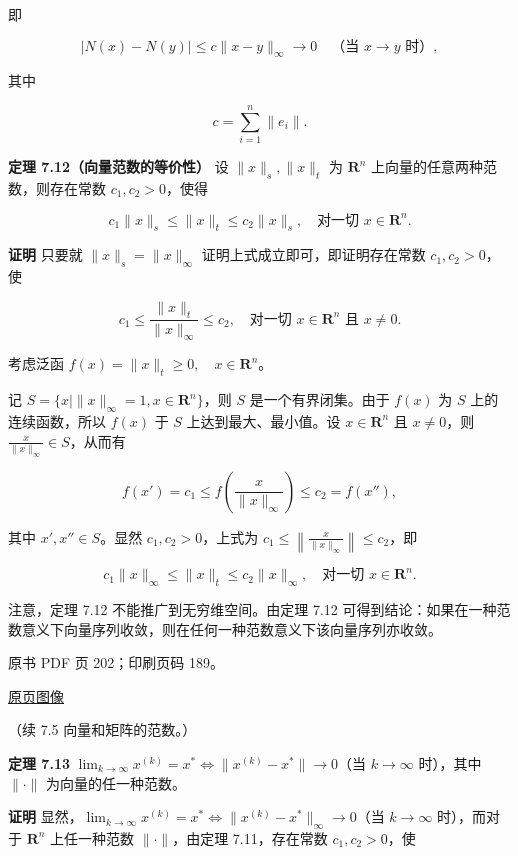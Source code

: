 即

\[
|N(x)-N(y)|\leqslant c\|x-y\|_\infty\to0\quad\text{（当 }x\to y\text{ 时）},
\]

其中

\[
c=\sum_{i=1}^{n}\|e_i\|.
\]

\textbf{定理 7.12（向量范数的等价性）} 设 \(\|x\|_s,\|x\|_t\) 为 \(\mathbf R^n\) 上向量的任意两种范数，则存在常数 \(c_1,c_2>0\)，使得

\[
c_1\|x\|_s\leqslant\|x\|_t\leqslant c_2\|x\|_s,\quad\text{对一切 }x\in\mathbf R^n.
\]

\textbf{证明} 只要就 \(\|x\|_s=\|x\|_\infty\) 证明上式成立即可，即证明存在常数 \(c_1,c_2>0\)，使

\[
c_1\leqslant\frac{\|x\|_t}{\|x\|_\infty}\leqslant c_2,\quad\text{对一切 }x\in\mathbf R^n\text{ 且 }x\neq0.
\]

考虑泛函 \(f(x)=\|x\|_t\geqslant0,\quad x\in\mathbf R^n\)。

记 \(S=\{x\mid\|x\|_\infty=1,x\in\mathbf R^n\}\)，则 \(S\) 是一个有界闭集。由于 \(f(x)\) 为 \(S\) 上的连续函数，所以 \(f(x)\) 于 \(S\) 上达到最大、最小值。设 \(x\in\mathbf R^n\) 且 \(x\neq0\)，则 \(\frac{x}{\|x\|_\infty}\in S\)，从而有

\[
f(x')=c_1\leqslant f\left(\frac{x}{\|x\|_\infty}\right)\leqslant c_2=f(x''),
\tag{7.5.3}
\]

其中 \(x',x''\in S\)。显然 \(c_1,c_2>0\)，上式为 \(c_1\leqslant\left\|\frac{x}{\|x\|_\infty}\right\|\leqslant c_2\)，即

\[
c_1\|x\|_\infty\leqslant\|x\|_t\leqslant c_2\|x\|_\infty,\quad\text{对一切 }x\in\mathbf R^n.
\]

注意，定理 7.12 不能推广到无穷维空间。由定理 7.12 可得到结论：如果在一种范数意义下向量序列收敛，则在任何一种范数意义下该向量序列亦收敛。

\clearpage

原书 PDF 页 202；印刷页码 189。

\href{source-images/pdf-202.jpeg}{原页图像}

（续 7.5 向量和矩阵的范数。）

\textbf{定理 7.13} \(\lim_{k\to\infty}x^{(k)}=x^*\Longleftrightarrow\|x^{(k)}-x^*\|\to0\)（当 \(k\to\infty\) 时），其中 \(\|\cdot\|\) 为向量的任一种范数。

\textbf{证明} 显然，\(\lim_{k\to\infty}x^{(k)}=x^*\Longleftrightarrow\|x^{(k)}-x^*\|_\infty\to0\)（当 \(k\to\infty\) 时），而对于 \(\mathbf R^n\) 上任一种范数 \(\|\cdot\|\)，由定理 7.11，存在常数 \(c_1,c_2>0\)，使

